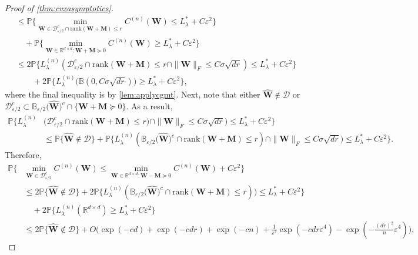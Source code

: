\documentclass[10pt]{article}
\newcommand{\eps}{\ensuremath{\varepsilon}}
\newcommand{\p}{\mathbb{P}}
\renewcommand{\hat}{\widehat}
\theoremstyle{definition}
\begin{document}
\begin{proof}[Proof of \cref{thm:cvxasymptotics}]
\begin{align}
    &\leq  \p\bigg\{  \min_{\bm{W} \in \mathcal{D}^c_{\eps/2} \cap \mathrm{rank}(\bm{W} + \bm{M}) \leq r} C^{(n)}(\bm{W}) \leq   L^{*}_{\lambda} + C \eps^2  \bigg\}   \\
    &\quad + \p\bigg\{   \min_{\bm{W} \in \mathbb{R}^{d\times d}: \bm{W} + \bm{M} \succcurlyeq 0} C^{(n)}(\bm{W}) \geq  L^{*}_{\lambda} + C \eps^2 \bigg\} \\
    &\leq 2 \p\bigg\{ L_{\lambda}^{(n)}(\mathcal{D}_{\eps/2}^c \cap \mathrm{rank}(\bm{W} + \bm{M}) \leq r \cap \|\bm{W}\|_F \leq C \sigma \sqrt{dr}) \leq  L^{*}_{\lambda} + C \eps^2  \bigg\} \\
    &\qquad + 2\p\bigg\{ L_{\lambda}^{(n)}\big(\mathbb{B}(0,C \sigma \sqrt{dr}) \big) \geq  L^{*}_{\lambda} + C \eps^2 \bigg\},
\end{align}
where the final inequality is by \cref{lem:applycgmt}.  Next, note that either $\bm{\hat W} \notin \mathcal{D} $ or $\mathcal{D}_{\eps/2}^c \subset \mathbb{B}_{\eps/2 }\big( \bm{\hat W}\big)^c \cap \{ \bm{W} + \bm{M} \succcurlyeq 0 \}.$ As a result,
\begin{align}
    \p\bigg\{ L_{\lambda}^{(n)}&\big( \mathcal{D}_{\eps/2}^c  \cap \mathrm{rank}(\bm{W} + \bm{M}) \leq r) \cap \|\bm{W}\|_F \leq C \sigma \sqrt{dr}\big) \leq L_{\lambda}^{*} + C \eps^2 \bigg\} \\
    &\leq \p \big\{ \bm{\hat W} \notin \mathcal{D} \big\}  +  \p\bigg\{ L_{\lambda}^{(n)}( \mathbb{B}_{\eps/2 }\big( \bm{\hat W}\big)^c  \cap \mathrm{rank}(\bm{W} + \bm{M}) \leq r) \cap \|\bm{W}\|_F \leq C \sigma \sqrt{dr}\big) \leq L^{*}_{\lambda} + C \eps^2 \bigg\}.
\end{align}
Therefore, 
\begin{align}
    \p\bigg\{& \min_{\bm{W} \in \mathcal{D}_{\eps/2}^c} C^{(n)}(\bm{W}) \leq \min_{\bm{W} \in \mathbb{R}^{d\times d}: \bm{W} - \bm{M} \succcurlyeq 0} C^{(n)}(\bm{W}) + C \eps ^2 \bigg\}  \\
    &\leq 2 \p \big\{ \bm{\hat W} \notin \mathcal{D} \big\} +  2\p\bigg\{ L_{\lambda}^{(n)}( \mathbb{B}_{\eps/2 }\big( \bm{\hat W}\big)^c  \cap \mathrm{rank}(\bm{W} + \bm{M}) \leq r)\big)  \leq L^{*}_{\lambda} + C \eps^2 \bigg\} \\
    &\quad + 2 \p\bigg\{ L_{\lambda}^{(n)} (\mathbb{R}^{d\times d}) \geq L_{\lambda}^{*} + C \eps^2 \bigg\} \\
    &\leq 2 \p \big\{ \bm{\hat W} \notin \mathcal{D} \big\} + O\bigg( \exp( - c d) +  \exp( - c dr) + \exp( - c n) + \frac{1}{\eps^2} \exp(-c dr \eps^4 ) - \exp( - \frac{(dr)^2}{n} \eps^4) \bigg),
\end{align}

\end{proof}
\end{document}
